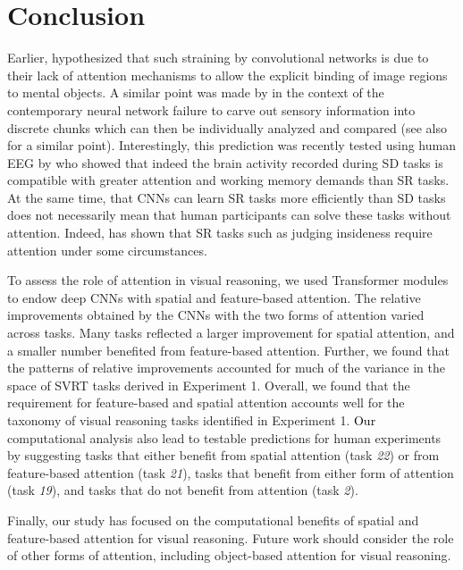 \section{Conclusion}

Earlier, \citet{kim2018not} hypothesized that such straining by convolutional networks is due to their lack of attention mechanisms to allow the explicit binding of image regions to mental objects. A similar point was made by \citet{greff2020binding} in the context of the contemporary neural network failure to carve out sensory information into discrete chunks which can then be individually analyzed and compared (see also \citet{10.1007/978-3-540-75555-5_15} for a similar point). Interestingly, this prediction was recently tested using human EEG by \citet{AlamiaENEURO.0267-20.2020} who showed that indeed the brain activity recorded during SD tasks is compatible with greater attention and working memory demands than SR tasks. At the same time, that CNNs can learn SR tasks more efficiently than SD tasks does not necessarily mean that human participants can solve these tasks without attention. Indeed, \citep{logan1994spatial} has shown that SR tasks such as judging insideness require attention under some circumstances.

To assess the role of attention in visual reasoning, we used Transformer modules to endow deep CNNs with spatial and feature-based attention. The relative improvements obtained by the CNNs with the two forms of attention varied across tasks. Many tasks reflected a larger improvement for spatial attention, and a smaller number benefited from feature-based attention. Further, we found that the patterns of relative improvements accounted for much of the variance in the space of SVRT tasks derived in Experiment 1. Overall, we found that the requirement for feature-based and spatial attention accounts well for the taxonomy of visual reasoning tasks identified in Experiment 1.  \textcolor{black}{Our} computational analysis also lead to testable predictions for human experiments by suggesting tasks that either benefit from spatial attention (task \textit{22}) or from feature-based attention (task \textit{21}), tasks that benefit from either form of attention (task \textit{19}), and tasks that do not benefit from attention (task \textit{2}).


Finally, our study has focused on the computational benefits of spatial and feature-based attention for visual reasoning. Future work should consider the role of other forms of attention, including object-based attention \citep{egly1994covert} for visual reasoning.

